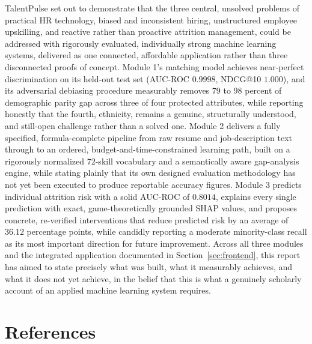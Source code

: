 \documentclass[11pt,a4paper]{article}
\begin{document}
TalentPulse set out to demonstrate that the three central, unsolved problems of practical HR technology, biased and inconsistent hiring, unstructured employee upskilling, and reactive rather than proactive attrition management, could be addressed with rigorously evaluated, individually strong machine learning systems, delivered as one connected, affordable application rather than three disconnected proofs of concept. Module 1's matching model achieves near-perfect discrimination on its held-out test set (AUC-ROC $0.9998$, NDCG@10 $1.000$), and its adversarial debiasing procedure measurably removes 79 to 98 percent of demographic parity gap across three of four protected attributes, while reporting honestly that the fourth, ethnicity, remains a genuine, structurally understood, and still-open challenge rather than a solved one. Module 2 delivers a fully specified, formula-complete pipeline from raw resume and job-description text through to an ordered, budget-and-time-constrained learning path, built on a rigorously normalized 72-skill vocabulary and a semantically aware gap-analysis engine, while stating plainly that its own designed evaluation methodology has not yet been executed to produce reportable accuracy figures. Module 3 predicts individual attrition risk with a solid AUC-ROC of $0.8014$, explains every single prediction with exact, game-theoretically grounded SHAP values, and proposes concrete, re-verified interventions that reduce predicted risk by an average of $36.12$ percentage points, while candidly reporting a moderate minority-class recall as its most important direction for future improvement. Across all three modules and the integrated application documented in Section~\ref{sec:frontend}, this report has aimed to state precisely what was built, what it measurably achieves, and what it does not yet achieve, in the belief that this is what a genuinely scholarly account of an applied machine learning system requires.

\clearpage
\section*{References}
\end{document}
